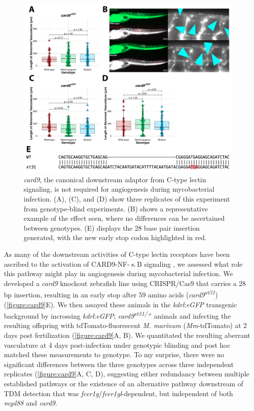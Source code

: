 \begin{figure}
\centering
\includegraphics[width=\textwidth]{images/card9.pdf}
\caption{\textit{card9}, the canonical downstream adaptor from C\hyp{}type lectin signaling, is not required for angiogenesis during mycobacterial infection. (A), (C), and (D) show three replicates of this experiment from genotype\hyp{}blind experiments. (B) shows a representative example of the effect seen, where no differences can be ascertained between genotypes. (E) displays the 28 base pair insertion generated, with the new early stop codon highlighted in red.}
\label{figure:card9}
\end{figure}

As many of the downstream activities of C\hyp{}type lectin receptors have been ascribed to the activation of CARD9\hyp{}NF\hyp{}$\upkappa$B signaling \citep{Goodridge2009, LobatoPascual2013, Zhao2014, Williams2017, Deerhake2021}, we assessed what role this pathway might play in angiogenesis during mycobacterial infection. We developed a \textit{card9} knockout zebrafish line using CRISPR/Cas9 that carries a 28 bp insertion, resulting in an early stop after 59 amino acids (\textit{card9\textsuperscript{xt31}}) (\autoref{figure:card9}E). We then assayed these animals in the \textit{kdrl}:\textit{eGFP} transgenic background by incrossing \textit{kdrl}:\textit{eGFP}; \textit{card9\textsuperscript{xt31/+}} animals and infecting the resulting offspring with tdTomato\hyp{}fluorescent \textit{M. marinum} (\textit{Mm}\hyp{}tdTomato) at 2 days post fertilization \citep{Jin2005, Oehlers2015}(\autoref{figure:card9}A, B). We quantitated the resulting aberrant vasculature at 4 days post\hyp{}infection under genotypic blinding and post hoc matched these measurements to genotype. To my surprise, there were no significant differences between the three genotypes across three independent replicates (\autoref{figure:card9}A, C, D), suggesting either redundancy between multiple established pathways or the existence of an alternative pathway downstream of TDM detection that was \textit{fcer1g}/\textit{fcer1gl}\hyp{}dependent, but independent of both \textit{myd88} and \textit{card9}. 

